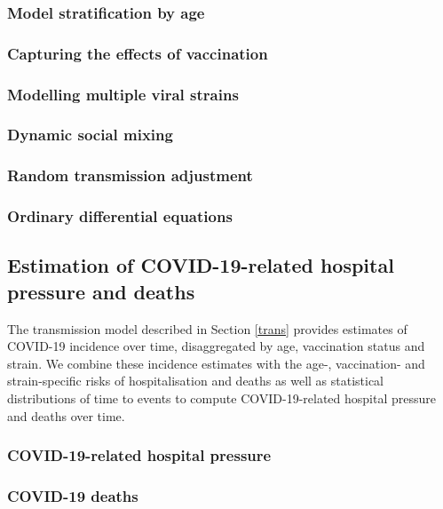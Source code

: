 \subsubsection{Model stratification by age}
\label{age}


\subsubsection{Capturing the effects of vaccination}
\label{vaccination}


\subsubsection{Modelling multiple viral strains}
 


\subsubsection{Dynamic social mixing}
\label{mixing}
 

\subsubsection{Random transmission adjustment}
\label{random_process}
 

\subsubsection{Ordinary differential equations}
\label{ODEs}
 



\subsection{Estimation of COVID-19-related hospital pressure and deaths}
The transmission model described in Section \ref{trans} provides estimates of COVID-19 incidence over time, disaggregated by age, vaccination status and strain. 
We combine these incidence estimates with the age-, vaccination- and strain-specific risks of hospitalisation and deaths as well as 
statistical distributions of time to events to compute COVID-19-related hospital pressure and deaths over time.

\subsubsection{COVID-19-related hospital pressure}
\label{hosp}
 

\subsubsection{COVID-19 deaths}
 

